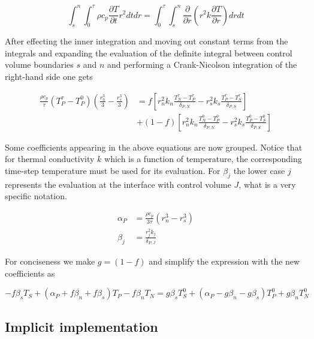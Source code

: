 \documentclass[oneside]{textbook}
\begin{document}
\begin{equation}
\int_{s}^{n}\int_{0}^{\tau}
\rho{}c_{p}\frac{\partial{}T}{\partial{}t}r^2dtdr=
\int_{0}^{\tau}\int_{s}^{n}
\frac{\partial}{\partial{}r}
\left(r^2k\frac{\partial{}T}{\partial{}r}\right)drdt
\end{equation}

After effecting the inner integration and moving out constant terms from the integrals and expanding the evaluation of the definite integral between control volume boundaries $s$ and $n$ and performing a Crank-Nicolson integration of the right-hand side one gets

\begin{equation}
\begin{aligned}
	\frac{\rho{}c_{p}}{\tau}
	\left(T_P^{\tau}-T_P^{0}\right)
	\left(\frac{r_n^3}{3}-\frac{r_s^3}{3}\right)
	&=f\left[
	r_n^2k_n\frac{T_N^{\tau}-T_P^{\tau}}{\delta_{P,N}}-
	r_s^2k_s\frac{T_P^{\tau}-T_S^{\tau}}{\delta_{P,S}}
	\right]\\[8pt]
	&+(1-f)\left[
	r_n^2k_n\frac{T_N^{0}-T_P^{0}}{\delta_{P,N}}-
	r_s^2k_s\frac{T_P^{0}-T_S^{0}}{\delta_{P,S}}
	\right]
\end{aligned}
\end{equation}

Some coefficients appearing in the above equations are now grouped. Notice that for thermal conductivity $k$ which is a function of temperature, the corresponding time-step temperature must be used for its evaluation. For $\beta_{j}$ the lower case $j$ represents the evaluation at the interface with control volume $J$, what is a very specific notation.

\begin{equation}
\begin{aligned}
	\alpha_{P}  & = \frac{\rho{}c_{p}}{3\tau}\left(r_n^3-r_s^3\right)\\[8pt]
	\beta_{j}   & = \frac{r_j^2k_j}{\delta_{P,J}}
\end{aligned}
\end{equation}

For conciseness we make $g=(1-f)$ and simplify the expression with the new coefficients as

\begin{equation}
-f\beta_{s}T_S+
(\alpha_{P}+f\beta_{n}+f\beta_{s})T_P
-f\beta_{n}T_N
=
g\beta_{s}T_S^{0}+
(\alpha_{P}-g\beta_{n}-g\beta_{s})T_P^{0}+
g\beta_{n}T_N^{0}
\end{equation}

\subsection{Implicit implementation}
\end{document}
